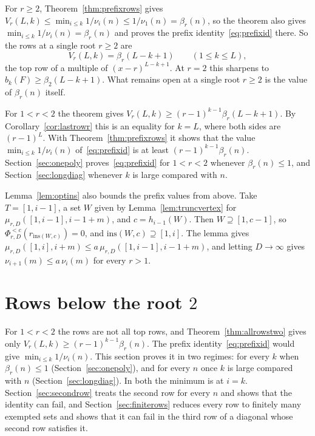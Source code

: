 \documentclass[11pt]{article}
\begin{document}
For $r\ge2$, Theorem~\ref{thm:prefixrows} gives
$V_r(L,k)\le\min_{i\le k}1/\nu_i(n)\le1/\nu_1(n)=\beta_r(n)$, so the theorem
also gives $\min_{i\le k}1/\nu_i(n)=\beta_r(n)$ and proves the prefix
identity~\eqref{eq:prefixid} there.  So the rows at a single
root $r\ge2$ are
\[
  V_r(L,k)=\beta_r(L-k+1)\qquad(1\le k\le L),
\]
the top row of a multiple of $(x-r)^{L-k+1}$.  At $r=2$ this sharpens
\cite[Theorem~4.13]{coefficient-mass} to $b_k(F)\ge\beta_2(L-k+1)$.  What
remains open at a single root $r\ge2$ is the value of $\beta_r(n)$ itself.

For $1<r<2$ the theorem gives $V_r(L,k)\ge(r-1)^{k-1}\beta_r(L-k+1)$.  By
Corollary~\ref{cor:lastrowr} this is an equality for $k=L$, where both sides
are $(r-1)^L$.  With Theorem~\ref{thm:prefixrows} it shows that the
value $\min_{i\le k}1/\nu_i(n)$ of~\eqref{eq:prefixid} is at least
$(r-1)^{k-1}\beta_r(n)$.  Section~\ref{sec:onepoly} proves~\eqref{eq:prefixid}
for $1<r<2$ whenever $\beta_r(n)\le1$, and Section~\ref{sec:longdiag}
whenever $k$ is large compared with $n$.

Lemma~\ref{lem:optins} also bounds the prefix values from above.  Take
$T=[1,i-1]$, a set $W$ given by Lemma~\ref{lem:truncvertex} for
$\mu_{r,D}([1,i-1],i-1+m)$, and $c=h_{i-1}(W)$.  Then $W\supseteq[1,c-1]$,
so $\Phi_{r,D}^{<c}(r_{\mathrm{ins}(W,c)})=0$, and
$\mathrm{ins}(W,c)\supseteq[1,i]$.  The lemma gives
$\mu_{r,D}([1,i],i+m)\le a\,\mu_{r,D}([1,i-1],i-1+m)$, and letting
$D\to\infty$ gives $\nu_{i+1}(m)\le a\,\nu_i(m)$ for every $r>1$.

\section{Rows below the root \texorpdfstring{$2$}{2}}\label{sec:belowtwo}

For $1<r<2$ the rows are not all top rows, and Theorem~\ref{thm:allrowstwo}
gives only $V_r(L,k)\ge(r-1)^{k-1}\beta_r(n)$.  The prefix identity~\eqref{eq:prefixid}
would give $\min_{i\le k}1/\nu_i(n)$.  This section proves it in two regimes: for
every $k$ when $\beta_r(n)\le1$ (Section~\ref{sec:onepoly}), and for every
$n$ once $k$ is large compared with $n$ (Section~\ref{sec:longdiag}).  In
both the minimum is at $i=k$.  Section~\ref{sec:secondrow} treats the
second row for every $n$ and shows that the identity can fail, and
Section~\ref{sec:finiterows} reduces every row to finitely many exempted
sets and shows that it can fail in the third row of a diagonal whose second
row satisfies it.
\end{document}
